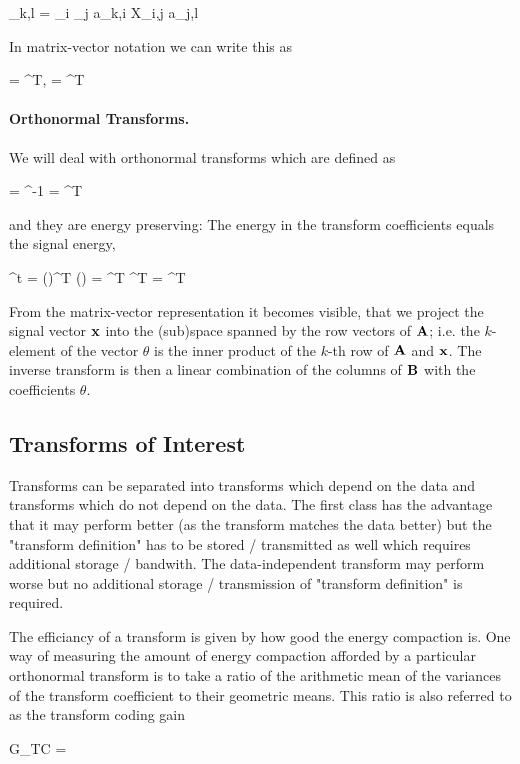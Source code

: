 \bee
\theta_{k,l} = \sum_i \sum_j a_{k,i} X_{i,j} a_{j,l}
\eee

In matrix-vector notation we can write this as

\bee
\theta = \Abf \Xbf \Abf^T, \qquad \Xbf = \Bbf \theta \Bbf^T
\eee



\paragraph{Orthonormal Transforms.} We will deal with orthonormal transforms which are defined as

\bee
\Bbf = \Abf^{-1} = \Abf^T
\eee

and they are energy preserving: The energy in the transform coefficients equals the signal energy,

\bee
\theta^t \theta = (\Abf \xbf)^T (\Abf \xbf) = \xbf^T \Abf^T \Abf \xbf = \xbf^T \xbf
\eee


From the matrix-vector representation it becomes visible, that we project the signal vector $\mathbf{x}$ into the (sub)space spanned by the row vectors of $\mathbf{A}$; i.e. the $k$-element of the vector $\theta$ is the inner product of the $k$-th row of $\mathbf{A}$ and $\mathbf{x}$. The inverse transform is then a linear combination of the columns of $\mathbf{B}$ with the coefficients $\theta$.



\subsection{Transforms of Interest}

Transforms can be separated into transforms which depend on the data and transforms which do not depend on the data. The first class has the advantage that it may perform better (as the transform matches the data better) but the "transform definition" has to be stored / transmitted as well which requires additional storage / bandwith. The data-independent transform may perform worse but no additional storage / transmission of "transform definition" is required.


The efficiancy of a transform is given by how good the energy compaction is. One way of measuring the amount of energy compaction afforded by a particular orthonormal transform is to take a ratio of the arithmetic mean of the variances of the transform coefficient to their geometric means. This ratio is also referred to as the transform coding gain 

\bee
G_{TC} = 
\eee

